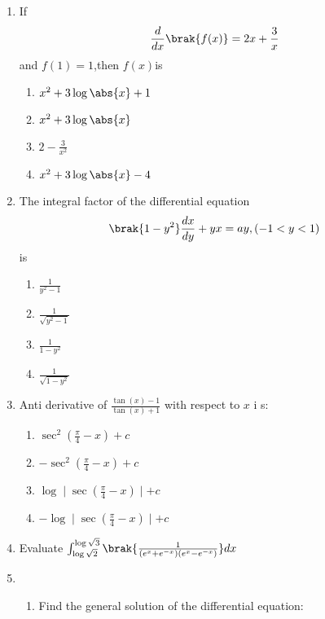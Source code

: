 %
\begin{enumerate}
    \item If
    \begin{align}
        \frac{d}{dx}\brak{f(x)} = 2x+\frac{3}{x}
    \end{align}
    and $ f(1) = 1 $,then $f(x)$is
    \begin{enumerate}
        \item $ x^2 +3\log \abs{x} + 1 $
        \item $ x^2 + 3\log \abs{x} $
        \item $ 2 - \frac{3}{x^2}$
        \item $ x^2 +3\log \abs{x} - 4 $
    \end{enumerate}
    \item The integral factor of the differential equation
    \begin{align}
        \brak{1-y^2} \frac{dx}{dy} + yx = ay,(-1<y<1)
    \end{align}
    is
    \begin{enumerate}
        \item $ \frac{1}{y^2 - 1} $
        \item $ \frac{1}{\sqrt{y^2 - 1}}$
        \item $ \frac{1}{1-y^2}$
        \item $ \frac{1}{\sqrt{1-y^2}}$
    \end{enumerate}
    \item Anti derivative of $\frac{\tan(x)-1}{\tan(x)+1}$ with respect to $x$ i
s:
    \begin{enumerate}
        \item $ \sec^2(\frac{\pi}{4} - x)+ c$
        \item $ -\sec^2(\frac{\pi}{4} - x)+c$
        \item $ \log \mid\sec(\frac{\pi}{4}-x)\mid +c$
        \item $ -\log \mid\sec(\frac{\pi}{4}-x)\mid +c$
    \end{enumerate}
    \item Evaluate $\int^{\log\sqrt{3}}_{\log\sqrt{2}}\brak{\frac{1}{(e^x+e^{-x}
)(e^x-e^{-x})}}dx$
    \item
    \begin{enumerate}
        \item Find the general solution of the differential equation:
          \begin{align}

\end{align}
\end{enumerate}
\end{enumerate}

